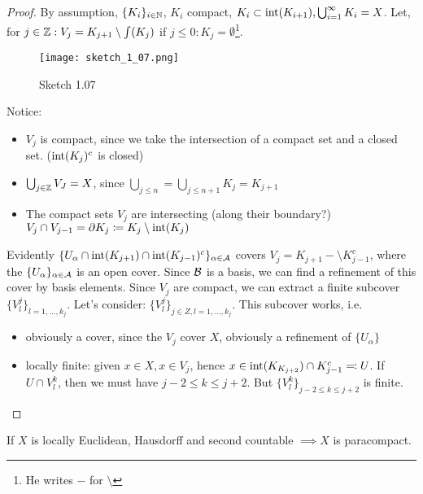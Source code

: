 \begin{proof}
    By assumption, \(\{K_i\}_{i\in \mathbb{N}}\), \(K_i\) compact, \(K_i\subset\text{int}(K_{i+1}),\bigcup_{i=1}^\infty K_i=X\).
    Let, for  \(j\in\mathbb{Z}: V_j=K_{j+1}\setminus \int (K_j)\) if \(j\leq 0: K_j=\emptyset\)\footnote{He writes \(-\) for \(\setminus\)}.
    \begin{figure}[H]
        \centering
        \texttt{[image: sketch\_1\_07.png]}
        \caption{Sketch 1.07}
    \end{figure}
    Notice:
    \begin{itemize}
        \item \(V_j\) is compact, since we take the intersection of a compact set and a closed set. (\(\text{int}(K_j)^c\) is closed)
        \item \(\bigcup_{j\in \mathbb{Z}} V_J=X\), since \(\bigcup_{j\leq n}=\bigcup_{j\leq n+1} K_j=K_{j+1}\)
        \item The compact sets \(V_j\) are intersecting (along their boundary?) \(V_j\cap V_{j-1}=\partial K_j\coloneqq K_j\setminus\text{int}(K_j)\)
    \end{itemize}
    Evidently \(\{U_\alpha \cap \text{int}(K_{j+1})\cap \text{int}(K_{j-1})^c\}_{\alpha\in\mathcal{A}}\) covers \(V_j=K_{j+1}-\setminus K_{j-1}^c\), where the \(\{U_\alpha\}_{\alpha\in\mathcal{A}}\) is an open cover.
    Since \(\mathcal{B}\) is a basis, we can find a refinement of this cover by basis elements. Since \(V_j\) are compact, we can extract a 
    finite subcover \(\{V_l^j\}_{l=1,\dots,k_j}\). Let's consider: \(\{V_l^j\}_{j\in Z, l=1,\dots,k_j}\). This 
    subcover works, i.e. 
    \begin{itemize}
        \item obviously a cover, since the \(V_j\) cover \(X\), obviously a refinement of \(\{U_\alpha\}\) 
        \item locally finite: given \(x\in X, x\in V_j\), hence \(x\in \text{int}(K_{K_{j+2}})\cap K_{j-1}^c\eqqcolon U\). If 
              \(U\cap V_l^k\), then we must have \(j-2\leq k\leq j+2\). But \(\{V_l^k\}_{j-2\leq k\leq j+2}\) is finite. \qedhere  
    \end{itemize} 
\end{proof}

\begin{corollary}\label{cor:1.8}
    If \(X\) is locally Euclidean, Hausdorff and second countable \(\implies X\) is paracompact.
\end{corollary}

